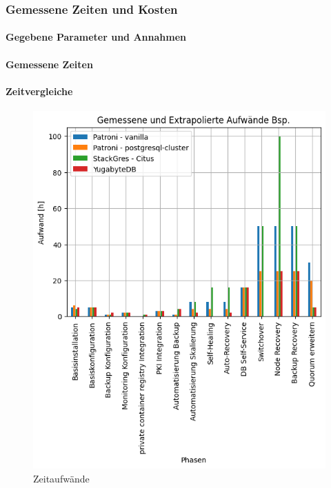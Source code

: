 
\begin{flushleft}
    \subsubsection{Gemessene Zeiten und Kosten}
    \paragraph{Gegebene Parameter und Annahmen}
    \paragraph{Gemessene Zeiten}
    \paragraph{Zeitvergleiche}

    
    \begin{figure}[H]
        \centering
        \includegraphics[width=1\linewidth]{source/pandas_data_chart_plotter/time_investment}
        \caption{Zeitaufwände}
        \label{fig:time_investment}
    \end{figure}

\end{flushleft}
